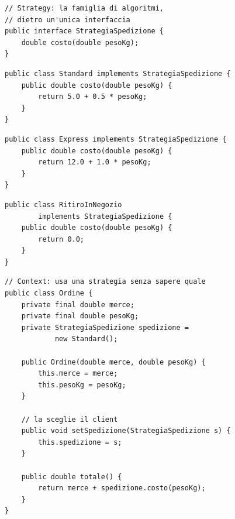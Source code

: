 \noindent\begin{minipage}[t]{0.49\textwidth}
\begin{lstlisting}[style=java, name=StrategiaSpedizione.java]
// Strategy: la famiglia di algoritmi,
// dietro un'unica interfaccia
public interface StrategiaSpedizione {
    double costo(double pesoKg);
}
\end{lstlisting}
\begin{lstlisting}[style=java, name=Standard.java]
public class Standard implements StrategiaSpedizione {
    public double costo(double pesoKg) {
        return 5.0 + 0.5 * pesoKg;
    }
}
\end{lstlisting}
\begin{lstlisting}[style=java, name=Express.java]
public class Express implements StrategiaSpedizione {
    public double costo(double pesoKg) {
        return 12.0 + 1.0 * pesoKg;
    }
}
\end{lstlisting}
\begin{lstlisting}[style=java, name=RitiroInNegozio.java]
public class RitiroInNegozio
        implements StrategiaSpedizione {
    public double costo(double pesoKg) {
        return 0.0;
    }
}
\end{lstlisting}
\end{minipage}\hfill
\begin{minipage}[t]{0.49\textwidth}
\begin{lstlisting}[style=java, name=Ordine.java]
// Context: usa una strategia senza sapere quale
public class Ordine {
    private final double merce;
    private final double pesoKg;
    private StrategiaSpedizione spedizione =
            new Standard();

    public Ordine(double merce, double pesoKg) {
        this.merce = merce;
        this.pesoKg = pesoKg;
    }

    // la sceglie il client
    public void setSpedizione(StrategiaSpedizione s) {
        this.spedizione = s;
    }

    public double totale() {
        return merce + spedizione.costo(pesoKg);
    }
}
\end{lstlisting}
\end{minipage}

